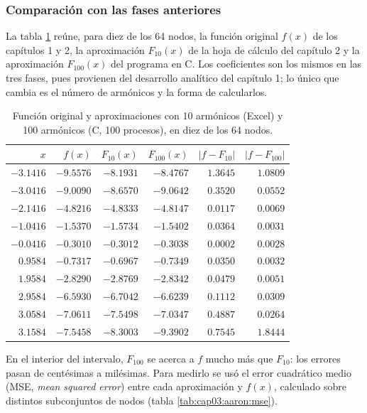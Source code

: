 \subsubsection{Comparación con las fases anteriores}
\label{sec:cap03:aaron:comparacion}

La tabla \ref{tab:cap03:aaron:comparacion} reúne, para diez de los 64 nodos, la función original $f(x)$ de los capítulos 1 y 2, la aproximación $F_{10}(x)$ de la hoja de cálculo del capítulo 2 y la aproximación $F_{100}(x)$ del programa en C. Los coeficientes son los mismos en las tres fases, pues provienen del desarrollo analítico del capítulo 1; lo único que cambia es el número de armónicos y la forma de calcularlos.

\begin{table}[H]
    \centering
    \caption{Función original y aproximaciones con 10 armónicos (Excel) y 100 armónicos (C, 100 procesos), en diez de los 64 nodos.}
    \label{tab:cap03:aaron:comparacion}
    \begin{tabular}{rrrrrr}
        \toprule
        $x$ & $f(x)$ & $F_{10}(x)$ & $F_{100}(x)$ & $|f - F_{10}|$ & $|f - F_{100}|$ \\
        \midrule
        $-3.1416$ & $-9.5576$ & $-8.1931$ & $-8.4767$ & $1.3645$ & $1.0809$ \\
        $-3.0416$ & $-9.0090$ & $-8.6570$ & $-9.0642$ & $0.3520$ & $0.0552$ \\
        $-2.1416$ & $-4.8216$ & $-4.8333$ & $-4.8147$ & $0.0117$ & $0.0069$ \\
        $-1.0416$ & $-1.5370$ & $-1.5734$ & $-1.5402$ & $0.0364$ & $0.0031$ \\
        $-0.0416$ & $-0.3010$ & $-0.3012$ & $-0.3038$ & $0.0002$ & $0.0028$ \\
        $0.9584$ & $-0.7317$ & $-0.6967$ & $-0.7349$ & $0.0350$ & $0.0032$ \\
        $1.9584$ & $-2.8290$ & $-2.8769$ & $-2.8342$ & $0.0479$ & $0.0051$ \\
        $2.9584$ & $-6.5930$ & $-6.7042$ & $-6.6239$ & $0.1112$ & $0.0309$ \\
        $3.0584$ & $-7.0611$ & $-7.5498$ & $-7.0347$ & $0.4887$ & $0.0264$ \\
        $3.1584$ & $-7.5458$ & $-8.3003$ & $-9.3902$ & $0.7545$ & $1.8444$ \\
        \bottomrule
    \end{tabular}
\end{table}

En el interior del intervalo, $F_{100}$ se acerca a $f$ mucho más que $F_{10}$: los errores pasan de centésimas a milésimas. Para medirlo se usó el error cuadrático medio (MSE, \textit{mean squared error}) entre cada aproximación y $f(x)$, calculado sobre distintos subconjuntos de nodos (tabla \ref{tab:cap03:aaron:mse}).

